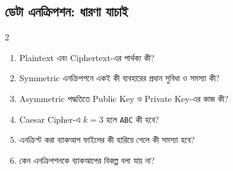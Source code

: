 \subsection{ডেটা এনক্রিপশন: ধারণা যাচাই}
\begin{multicols}{2}
\small
\begin{enumerate}
\item \begin{minipage}[t]{\linewidth}
Plaintext এবং Ciphertext-এর পার্থক্য কী?
\end{minipage}
\item \begin{minipage}[t]{\linewidth}
Symmetric এনক্রিপশনে একই কী ব্যবহারের প্রধান
          সুবিধা ও সমস্যা কী?
\end{minipage}
\item \begin{minipage}[t]{\linewidth}
Asymmetric পদ্ধতিতে Public Key ও Private Key-এর কাজ কী?
\end{minipage}
\item \begin{minipage}[t]{\linewidth}
Caesar Cipher-এ \(k=3\) হলে \texttt{ABC} কী হবে?
\end{minipage}
\item \begin{minipage}[t]{\linewidth}
এনক্রিপ্ট করা ব্যাকআপ ফাইলের কী হারিয়ে গেলে কী সমস্যা হবে?
\end{minipage}
\item \begin{minipage}[t]{\linewidth}
কেন এনক্রিপশনকে ব্যাকআপের বিকল্প বলা যায় না?
\end{minipage}
\end{enumerate}
\end{multicols}



